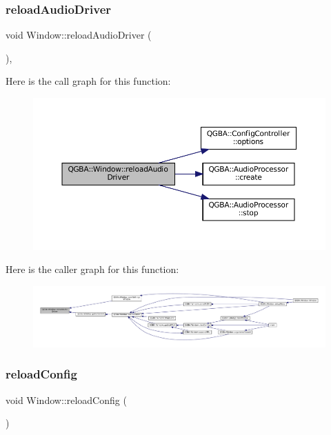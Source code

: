 \subsubsection{\texorpdfstring{reload\+Audio\+Driver}{reloadAudioDriver}}
{\footnotesize\ttfamily void Window\+::reload\+Audio\+Driver (\begin{DoxyParamCaption}{ }\end{DoxyParamCaption})\hspace{0.3cm}{\ttfamily [private]}, {\ttfamily [slot]}}

Here is the call graph for this function\+:
\nopagebreak
\begin{figure}[H]
\begin{center}
\leavevmode
\includegraphics[width=350pt]{class_q_g_b_a_1_1_window_a73b1dabfc487f31687b92bb4bb24a425_cgraph}
\end{center}
\end{figure}
Here is the caller graph for this function\+:
\nopagebreak
\begin{figure}[H]
\begin{center}
\leavevmode
\includegraphics[width=350pt]{class_q_g_b_a_1_1_window_a73b1dabfc487f31687b92bb4bb24a425_icgraph}
\end{center}
\end{figure}
\mbox{\label{class_q_g_b_a_1_1_window_aad41987baa475389a724b96d53183db2}} 
\subsubsection{\texorpdfstring{reload\+Config}{reloadConfig}}
{\footnotesize\ttfamily void Window\+::reload\+Config (\begin{DoxyParamCaption}{ }\end{DoxyParamCaption})\hspace{0.3cm}{\ttfamily [slot]}}

